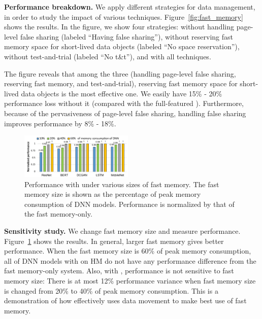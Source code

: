 \textbf{Performance breakdown.}
We apply different strategies for data management, in order to study the impact of various techniques. Figure~\ref{fig:fast_memory} shows the results. In the figure, we show four strategies: \name without handling page-level false sharing (labeled ``Having false sharing''), \name without reserving fast memory space for short-lived data objects (labeled ``No space reservation''), \name without test-and-trial (labeled ``No t\&t''), and \name with all techniques.

The figure reveals that among the three (handling page-level false sharing, reserving fast memory, and test-and-trial), 
reserving fast memory space for short-lived data objects is the most effective one. We easily have \textcolor{check}{15\% - 20\%} 
performance loss without it (compared with the full-featured \name). Furthermore, because of the pervasiveness of page-level false sharing, handling false sharing improves performance by \textcolor{check}{8\% - 18\%}.



\begin{figure}[htb!]
	\centering
	\includegraphics[width=0.48\textwidth]{figures/diff_size.pdf}
	\vspace{-20pt}
\caption{Performance with \name under various sizes of fast memory. The fast memory size is shown as the percentage of peak memory consumption of DNN models. Performance is normalized by that of the fast memory-only.}
\vspace{-5pt}
\label{fig:fast_memory_sen}
\end{figure}

\textbf{Sensitivity study.}
We change fast memory size and measure performance. Figure~\ref{fig:fast_memory_sen} shows the results. In general, larger fast memory gives better performance. When the fast memory size is 60\% of peak memory consumption, all of DNN models with \name on HM do not have any performance difference from the fast memory-only system. Also, with \name, performance is not sensitive to fast memory size: There is at most 
\textcolor{check}{12\%}
performance variance \textcolor{check}{when fast memory size is changed from 20\% to 40\% of peak memory consumption}. This is a demonstration of how \name effectively uses data movement to make best use of fast memory. 

